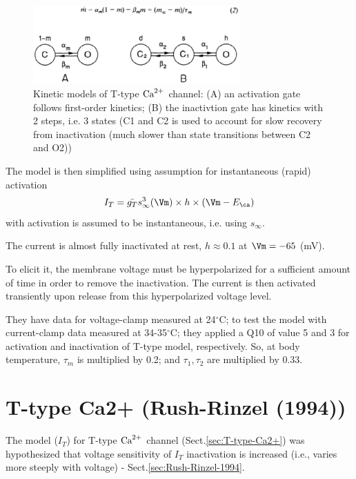 \begin{figure}[htb]
  \centerline{\includegraphics[height=3cm]{./images/HH-gates-T-type-Ca-Wang-1991.eps}}
  \caption{Kinetic models of T-type ${\text{Ca}^{2+}}$ channel: (A) an activation gate
  follows first-order kinetics; (B) the inactivtion gate has kinetics with 2 steps, i.e.
  3 states (C1 and C2 is used to account for slow recovery from inactivation
  (much slower than state transitions between C2 and O2))}
  \label{fig:HH-gates-T-type-Ca-Wang-1991}
\end{figure}


The model is then simplified using  assumption for instantaneous
(rapid) activation
\begin{equation}
I_T = \bar{g_T} s_\infty^3(\Vm) \times h \times (\Vm - E_\ca)
\end{equation}
with activation is assumed to be instantaneous, i.e. using $s_\infty$.

The current is almost fully inactivated at rest, $h \approx 0.1$ at 
$\Vm = -65$ (mV).

To elicit it, the membrane voltage must be hyperpolarized for a sufficient
amount of time in order to remove the inactivation. The current is then
activated transiently upon release from this hyperpolarized voltage level.

They have data for voltage-clamp measured at 24$^\circ$C; to test the model with
current-clamp data measured at 34-35$^\circ$C; they applied a Q10 of value 5 and
3 for activation and inactivation of T-type model, respectively. So, at body
temperature, $\tau_m$ is multiplied by 0.2; and $\tau_1, \tau_2$ are multiplied
by 0.33.


\section{T-type Ca2+ (Rush-Rinzel (1994))}
\label{sec:T-type-Ca2+-Rush-Rinzel-1994}

The model ($I_T$) for T-type ${\text{Ca}^{2+}}$ channel (Sect.\ref{sec:T-type-Ca2+}) was
hypothesized that voltage sensitivity of $I_T$ inactivation is increased (i.e.,
varies more steeply with voltage) - Sect.\ref{sec:Rush-Rinzel-1994}.

